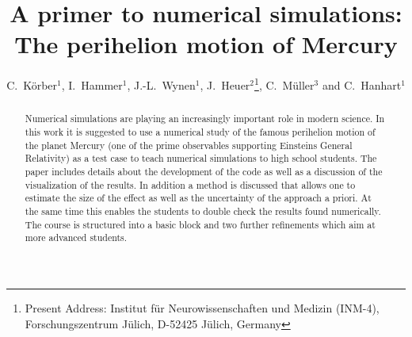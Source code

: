 \documentclass[12pt,ngerman,american]{iopart}
\begin{document}
\title[A primer to numerical simulations]{A primer to numerical simulations: The perihelion motion of Mercury}

\author{
	C.~K\"orber$^{1}$,
	I.~Hammer$^{1}$,
	J.-L.~Wynen$^{1}$,
	J.~Heuer$^{2}$\footnote{Present Address: Institut f\"ur Neurowissenschaften und Medizin (INM-4), Forschungszentrum J\"ulich, D-52425 J\"ulich, Germany},
	C.~M\"uller$^{3}$ and
	C.~Hanhart$^{1}$
}
\address{
	$^1$ \textit{Institut f\"ur Kernphysik (IKP-3) and Institute for Advanced Simulations (IAS-4), Forschungszentrum J\"ulich, D-52425 J\"ulich, Germany}\\
	$^2$ \textit{Hochschule Hamm-Lippstadt, Marker Allee 76-78, 59063 Hamm, Germany}\\
	$^3$ \textit{Sch\"ulerlabor JuLab, Forschungszentrum J\"ulich, D-52425 J\"ulich, Germany}
}
\vspace{10pt}

\begin{abstract}
Numerical simulations are playing an increasingly important role in modern science.
In this work it is suggested to use a numerical study of the famous perihelion motion of the planet Mercury (one of the prime observables supporting Einsteins General Relativity) as a test case to teach numerical simulations to high school students.
The paper includes details about the development of the code as well as a discussion of the visualization of the results.
In addition a method is discussed that allows one to estimate the size of the effect as well as the uncertainty of
the approach a priori. At the same time this enables the students to double check the results found numerically.
The course is structured into a basic block and two further refinements which aim at more advanced students.
\end{abstract}

%
%
%
% 
%
\end{document}
